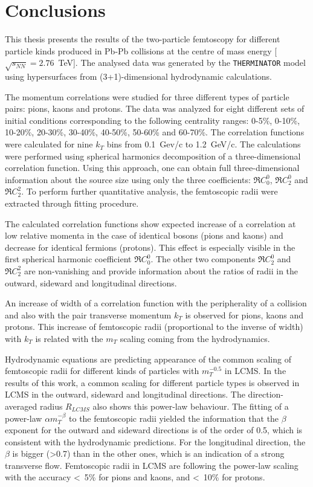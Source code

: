 \chapter*{Conclusions}
  This thesis presents the results of the two-particle femtoscopy for different particle kinds produced in Pb-Pb collisions at the centre of mass energy \mbox[$\sqrt{s_{NN}} = 2.76$~TeV].
  The analysed data was generated by the \verb|THERMINATOR| model using hypersurfaces from (3+1)-dimensional hydrodynamic calculations.

  The momentum correlations were studied for three different types of particle pairs: pions, kaons and protons.
  The data was analyzed for eight different sets of initial conditions corresponding to the following centrality ranges: 0-5\%, 0-10\%, 10-20\%, 20-30\%, 30-40\%, 40-50\%, 50-60\% and 60-70\%.
  The correlation functions were calculated for nine $k_T$ bins from 0.1~Gev/c to 1.2~GeV/c.
  The calculations were performed using spherical harmonics decomposition of a three-dimensional correlation function.
  Using this approach, one can obtain full three-dimensional information about the source size using only the three coefficients: $\Re C^0_0$, $\Re C^0_2$ and $\Re C^2_2$.
  To perform further quantitative analysis, the femtoscopic radii were extracted through fitting procedure.

  The calculated correlation functions show expected increase of a correlation at low relative momenta in the case of identical bosons (pions and kaons) and decrease for identical fermions (protons).
  This effect is especially visible in the first spherical harmonic coefficient $\Re C^0_0$.
  The other two components $\Re C^0_2$ and $\Re C^2_2$ are non-vanishing and provide information about the ratios of radii in the outward, sideward and longitudinal directions.

  An increase of width of a correlation function with the peripherality of a collision and also with the pair transverse momentum $k_T$ is observed for pions, kaons and protons.
  This increase of femtoscopic radii (proportional to the inverse of width) with $k_T$ is related with the $m_T$ scaling coming from the hydrodynamics.

  Hydrodynamic equations are predicting appearance of the common scaling of femtoscopic radii for different kinds of particles with $m_T^{-0.5}$ in LCMS.
  In the results of this work, a common scaling for different particle types is observed in LCMS in the outward, sideward and longitudinal directions.
  The direction-averaged radius $R_{LCMS}$ also shows this power-law behaviour.
  The fitting of a power-law $\alpha m_T^{-\beta}$ to the femtoscopic radii yielded the information that the $\beta$ exponent for the outward and sideward directions is of the order of 0.5, which is consistent with the hydrodynamic predictions.
  For the longitudinal direction, the $\beta$ is bigger (>0.7) than in the other ones, which is an indication of a strong transverse flow.
  Femtoscopic radii in LCMS are following the power-law scaling with the accuracy <~5\% for pions and kaons, and <~10\% for protons.
  
